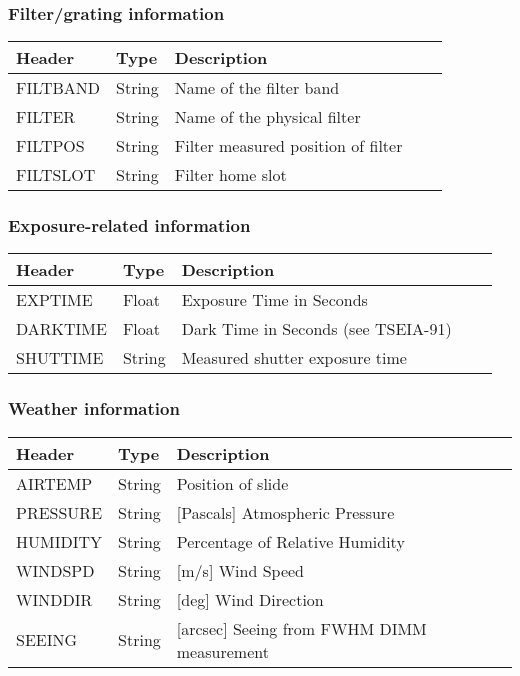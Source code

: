 \subsubsection{Filter/grating information}


\begin{tabular}{l l l l l}
\hline
Header & Type & Description \\
\hline
FILTBAND & String & Name of the filter band \\
FILTER & String & Name of the physical filter \\
FILTPOS & String & Filter measured position of filter \\
FILTSLOT & String & Filter home slot \\
\hline
\end{tabular}


\subsubsection{Exposure-related information}


\begin{tabular}{l l l l l}
\hline
Header & Type & Description \\
\hline
EXPTIME & Float & Exposure Time in Seconds \\
DARKTIME & Float & Dark Time in Seconds (see TSEIA-91) \\
SHUTTIME & String & Measured shutter exposure time \\
\hline
\end{tabular}


\subsubsection{Weather information}


\begin{tabular}{l l l l l}
\hline
Header & Type & Description \\
\hline
AIRTEMP & String & Position of slide \\
PRESSURE & String & [Pascals] Atmospheric Pressure \\
HUMIDITY & String & Percentage of Relative Humidity \\
WINDSPD & String & [m/s] Wind Speed \\
WINDDIR & String & [deg] Wind Direction \\
SEEING & String & [arcsec] Seeing from FWHM DIMM measurement \\
\hline
\end{tabular}


